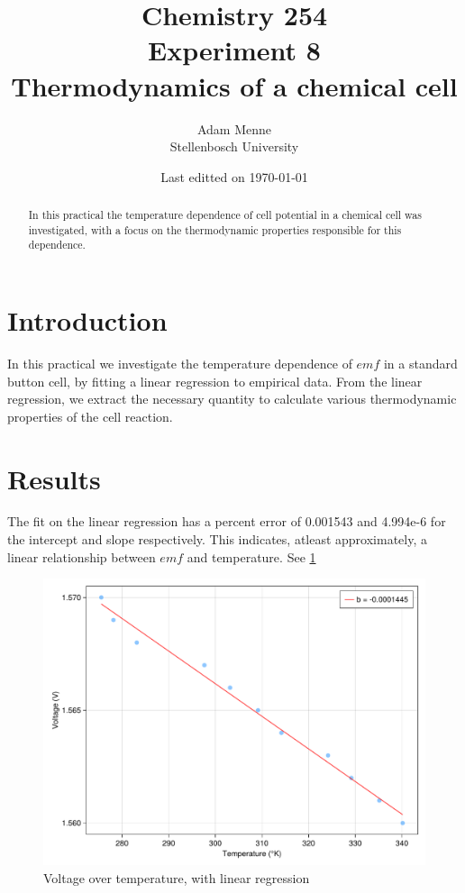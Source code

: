 \documentclass[a4paper, british]{article}
\title{Chemistry 254\\ Experiment 8\\ Thermodynamics of a chemical cell}
\date{Last editted on \today}
\author{Adam Menne\\ Stellenbosch University}
\begin{document}
\maketitle

\begin{abstract}
\noindent
In this practical the temperature dependence of cell potential in a chemical cell was investigated, with a focus on the thermodynamic properties responsible for this dependence.
\end{abstract}

\tableofcontents

\newpage

\section{Introduction}

In this practical we investigate the temperature dependence of \(emf\) in a standard button cell, by fitting a linear regression to empirical data. From the linear regression, we extract the necessary quantity to calculate various thermodynamic properties of the cell reaction.


\section{Results}

The fit on the linear regression has a percent error of 0.001543 and 4.994e-6 for the intercept and slope respectively. This indicates, atleast approximately, a linear relationship between \(emf\) and temperature. See \cref{fig:regression}

\begin{figure}[htb]
    \centering
    \includegraphics[width=\textwidth]{figures/regression.pdf}
    \caption{Voltage over temperature, with linear regression}
    \label{fig:regression}
\end{figure}
\end{document}
